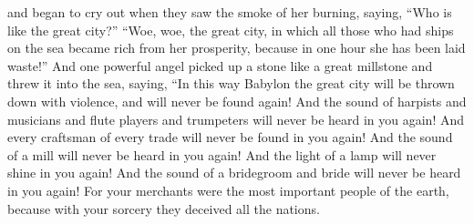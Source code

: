 \begin{biblechapter}
\verse and began to cry out when they saw the smoke of her burning, saying, “Who is like the great city?”
\verse “Woe, woe, the great city, 
in which all those who had ships on the sea 
became rich from her prosperity, 
because in one hour she has been laid waste!”
\verse And one powerful angel picked up a stone like a great millstone and threw it into the sea, saying,
\verse “In this way Babylon the great city will be thrown down with violence, 
and will never be found again!
\verse And the sound of harpists and musicians and flute players and trumpeters 
will never be heard in you again! 
And every craftsman of every trade 
will never be found in you again! 
And the sound of a mill 
will never be heard in you again!
\verse And the light of a lamp 
will never shine in you again! 
And the sound of a bridegroom and bride 
will never be heard in you again! 
For your merchants were the most important people of the earth, 
because with your sorcery they deceived all the nations.
\end{biblechapter}

